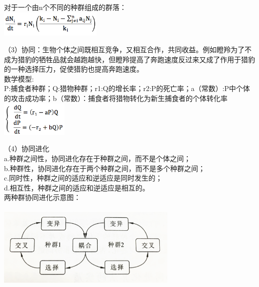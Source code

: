 \documentclass[8pt]{article}
\begin{document}
\begin{description}
      \item 对于一个由n个不同的种群组成的群落：\\     
      \includegraphics[width=0.37\textwidth]{6.png}\\
      \item（3）协同：生物个体之间既相互竞争，又相互合作，共同收益。例如瞪羚为了不成为猎豹的牺牲品就会越跑越快，但瞪羚提高了奔跑速度反过来又成了作用于猎豹的一种选择压力，促使猎豹也提高奔跑速度。 \\     
      数学模型:\\P:捕食者种群；Q:猎物种群；r1:Q的增长率；r2:P的死亡率；a（常数）:P中个体的攻击成功率；b（常数）：捕食者将猎物转化为新生捕食者的个体转化率\\
      \includegraphics[width=0.24\textwidth]{7.png} \\        
      \item（4）协同进化\\
      a.种群之间性，协同进化存在于种群之间，而不是个体之间；\\
      b.种群性，协同进化存在于两个种群之间，而不是多个种群之间；\\
      c.同时性，种群之间的适应和逆适应是同时发生的；\\
      d.相互性，种群之间的适应和逆适应是相互的。   \\
两种群协同进化示意图：\\\\
\includegraphics[width=0.65\textwidth]{8.png}
 \end{description}
\end{document}
